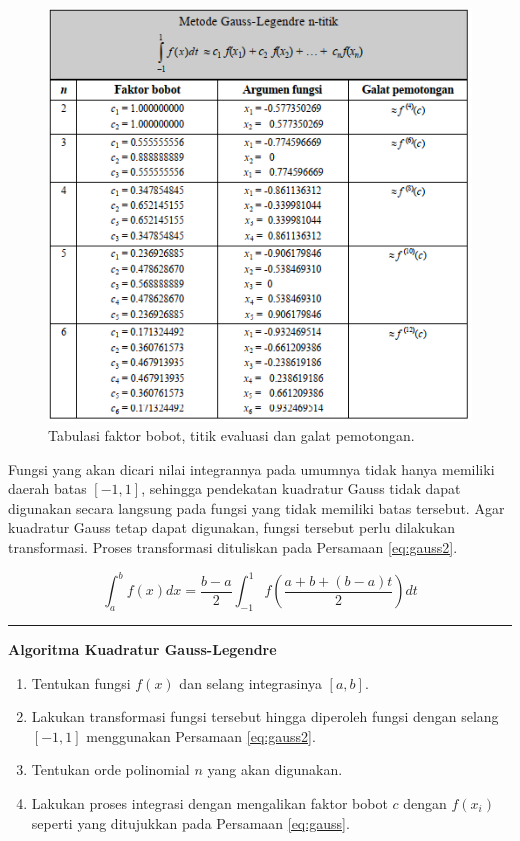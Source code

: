 \documentclass[
]{book}
\providecommand{\tightlist}{%
  \setlength{\itemsep}{0pt}\setlength{\parskip}{0pt}}
\theoremstyle{definition}
\theoremstyle{definition}
\theoremstyle{definition}
\theoremstyle{definition}
\theoremstyle{remark}
\begin{document}
\begin{figure}

{\centering \includegraphics[width=0.9\linewidth]{./images/gaussviz} 

}

\caption{Tabulasi faktor bobot, titik evaluasi dan galat pemotongan.}\label{fig:gaussviz}
\end{figure}

Fungsi yang akan dicari nilai integrannya pada umumnya tidak hanya memiliki daerah batas \(\left[-1,1\right]\), sehingga pendekatan kuadratur Gauss tidak dapat digunakan secara langsung pada fungsi yang tidak memiliki batas tersebut. Agar kuadratur Gauss tetap dapat digunakan, fungsi tersebut perlu dilakukan transformasi. Proses transformasi dituliskan pada Persamaan \eqref{eq:gauss2}.

\begin{equation}
\int_a^bf\left(x\right)dx=\frac{b-a}{2}\int_{-1}^1f\left(\frac{a+b+\left(b-a\right)t}{2}\right)dt
  \label{eq:gauss2}
\end{equation}

\begin{center}\rule{0.5\linewidth}{0.5pt}\end{center}

\textbf{Algoritma Kuadratur Gauss-Legendre}

\begin{enumerate}
\def\labelenumi{\arabic{enumi}.}
\tightlist
\item
  Tentukan fungsi \(f\left(x\right)\) dan selang integrasinya \(\left[a,b\right]\).
\item
  Lakukan transformasi fungsi tersebut hingga diperoleh fungsi dengan selang \(\left[-1,1\right]\) menggunakan Persamaan \eqref{eq:gauss2}.
\item
  Tentukan orde polinomial \(n\) yang akan digunakan.
\item
  Lakukan proses integrasi dengan mengalikan faktor bobot \(c\) dengan \(f\left(x_i\right)\) seperti yang ditujukkan pada Persamaan \eqref{eq:gauss}.
\end{enumerate}
\end{document}
